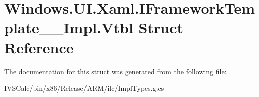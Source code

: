 \hypertarget{struct_windows_1_1_u_i_1_1_xaml_1_1_i_framework_template_____impl_1_1_vtbl}{}\section{Windows.\+U\+I.\+Xaml.\+I\+Framework\+Template\+\_\+\+\_\+\+Impl.\+Vtbl Struct Reference}
\label{struct_windows_1_1_u_i_1_1_xaml_1_1_i_framework_template_____impl_1_1_vtbl}


The documentation for this struct was generated from the following file\+:\begin{DoxyCompactItemize}
\item 
I\+V\+S\+Calc/bin/x86/\+Release/\+A\+R\+M/ilc/Impl\+Types.\+g.\+cs\end{DoxyCompactItemize}
